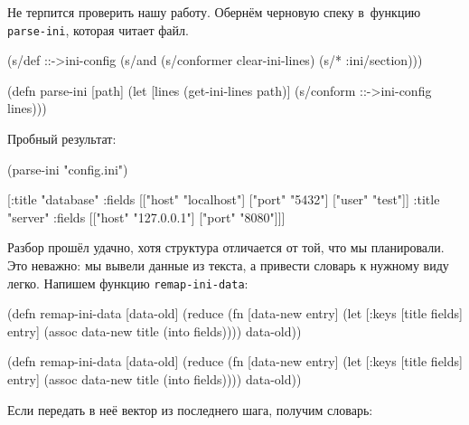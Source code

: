 Не терпится проверить нашу работу. Обернём черновую спеку в~функцию
\verb|parse-ini|, которая читает файл.

\begin{english}
  \begin{clojure}
(s/def ::->ini-config
  (s/and
   (s/conformer clear-ini-lines)
   (s/* :ini/section)))

(defn parse-ini [path]
  (let [lines (get-ini-lines path)]
    (s/conform ::->ini-config lines)))
  \end{clojure}
\end{english}

\noindent
Пробный результат:

\begin{english}
  \begin{clojure}
(parse-ini "config.ini")

[{:title "database"
  :fields [["host" "localhost"]
           ["port" "5432"]
           ["user" "test"]]}
 {:title "server"
  :fields [["host" "127.0.0.1"]
           ["port" "8080"]]}]
  \end{clojure}
\end{english}

Разбор прошёл удачно, хотя структура отличается от той, что мы планировали. Это
неважно: мы вывели данные из текста, а привести словарь к нужному виду
легко. Напишем функцию \verb|remap-ini-data|:

\ifx\DEVICETYPE\MOBILE

\begin{english}
  \begin{clojure}
(defn remap-ini-data [data-old]
  (reduce
   (fn [data-new entry]
     (let [{:keys [title fields]} entry]
       (assoc data-new
         title (into {} fields))))
   {}
   data-old))
  \end{clojure}
\end{english}

\else

\begin{english}
  \begin{clojure}
(defn remap-ini-data [data-old]
  (reduce
   (fn [data-new entry]
     (let [{:keys [title fields]} entry]
       (assoc data-new title (into {} fields))))
   {}
   data-old))
  \end{clojure}
\end{english}

\fi

\noindent
Если передать в неё вектор из последнего шага, получим словарь:

